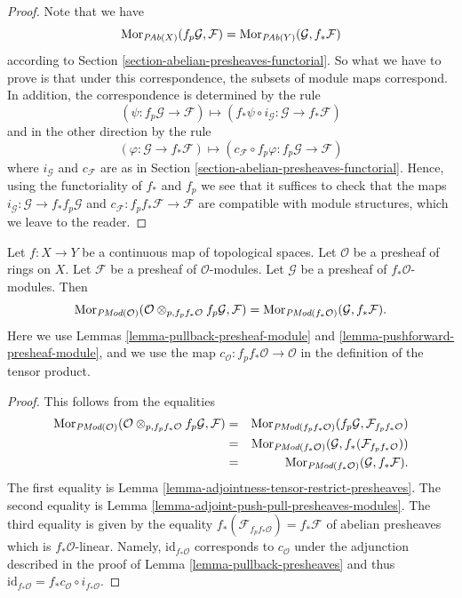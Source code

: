 \begin{proof}
Note that we have
$$
\mathop{\mathrm{Mor}}\nolimits_{\textit{PAb}(X)}(f_p\mathcal{G}, \mathcal{F})
=
\mathop{\mathrm{Mor}}\nolimits_{\textit{PAb}(Y)}(\mathcal{G}, f_*\mathcal{F})
$$
according to Section \ref{section-abelian-presheaves-functorial}.
So what we have to prove is that under this correspondence, the
subsets of module maps correspond. In addition, the correspondence
is determined by the rule
$$
(\psi : f_p\mathcal{G} \to \mathcal{F})
\longmapsto
(f_*\psi \circ i_\mathcal{G} :
\mathcal{G} \to f_* \mathcal{F})
$$
and in the other direction by the rule
$$
(\varphi : \mathcal{G} \to f_* \mathcal{F})
\longmapsto
(c_\mathcal{F} \circ f_p\varphi : f_p\mathcal{G} \to \mathcal{F})
$$
where $i_\mathcal{G}$ and $c_\mathcal{F}$ are as in
Section \ref{section-abelian-presheaves-functorial}.
Hence, using the functoriality of $f_*$ and $f_p$ we see that
it suffices to check that the maps
$i_\mathcal{G} : \mathcal{G} \to f_* f_p \mathcal{G}$ and
$c_\mathcal{F} : f_p f_* \mathcal{F} \to \mathcal{F}$
are compatible with module structures, which we leave to the reader.
\end{proof}

\begin{lemma}
\label{lemma-adjoint-pull-push-presheaves-modules}
Let $f : X \to Y$ be a continuous map of topological spaces.
Let $\mathcal{O}$ be a presheaf of rings on $X$.
Let $\mathcal{F}$ be a presheaf of $\mathcal{O}$-modules.
Let $\mathcal{G}$ be a presheaf of $f_*\mathcal{O}$-modules.
Then
$$
\mathop{\mathrm{Mor}}\nolimits_{\textit{PMod}(\mathcal{O})}(
\mathcal{O} \otimes_{p, f_pf_*\mathcal{O}} f_p\mathcal{G}, \mathcal{F})
=
\mathop{\mathrm{Mor}}\nolimits_{\textit{PMod}(f_*\mathcal{O})}(\mathcal{G}, f_*\mathcal{F}).
$$
Here we use
Lemmas \ref{lemma-pullback-presheaf-module}
and \ref{lemma-pushforward-presheaf-module}, and we use
the map $c_\mathcal{O} : f_pf_*\mathcal{O} \to \mathcal{O}$
in the definition of the tensor product.
\end{lemma}

\begin{proof}
This follows from the equalities
\begin{eqnarray*}
\mathop{\mathrm{Mor}}\nolimits_{\textit{PMod}(\mathcal{O})}(
\mathcal{O} \otimes_{p, f_pf_*\mathcal{O}} f_p\mathcal{G}, \mathcal{F})
& = &
\mathop{\mathrm{Mor}}\nolimits_{\textit{PMod}(f_pf_*\mathcal{O})}(
f_p\mathcal{G}, \mathcal{F}_{f_pf_*\mathcal{O}}) \\
& = &
\mathop{\mathrm{Mor}}\nolimits_{\textit{PMod}(f_*\mathcal{O})}(\mathcal{G},
f_*(\mathcal{F}_{f_pf_*\mathcal{O}})) \\
& = &
\mathop{\mathrm{Mor}}\nolimits_{\textit{PMod}(f_*\mathcal{O})}(\mathcal{G}, f_*\mathcal{F}).
\end{eqnarray*}
The first equality is
Lemma \ref{lemma-adjointness-tensor-restrict-presheaves}.
The second equality is
Lemma \ref{lemma-adjoint-push-pull-presheaves-modules}.
The third equality is given by the equality
$f_*(\mathcal{F}_{f_pf_*\mathcal{O}}) = f_*\mathcal{F}$
of abelian presheaves which is $f_*\mathcal{O}$-linear. Namely,
$\text{id}_{f_*\mathcal{O}}$ corresponds to $c_\mathcal{O}$
under the adjunction described in the proof of
Lemma \ref{lemma-pullback-presheaves}
and thus
$\text{id}_{f_*\mathcal{O}} = f_*c_\mathcal{O} \circ i_{f_*\mathcal{O}}$.
\end{proof}

